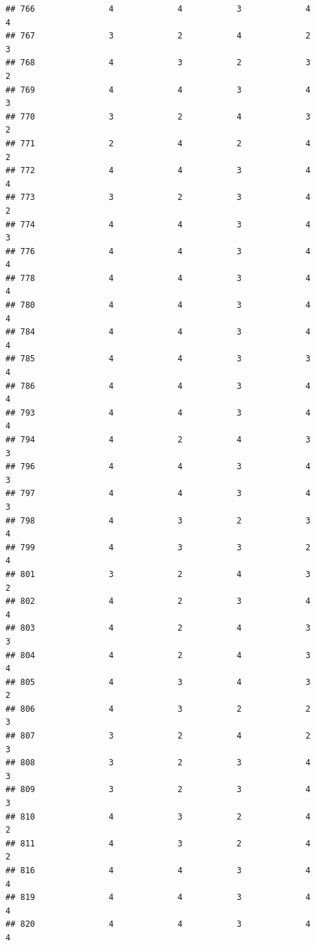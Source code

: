 \documentclass[
]{article}
\begin{document}
\begin{verbatim}
## 766               4             4           3             4            4
## 767               3             2           4             2            3
## 768               4             3           2             3            2
## 769               4             4           3             4            3
## 770               3             2           4             3            2
## 771               2             4           2             4            2
## 772               4             4           3             4            4
## 773               3             2           3             4            2
## 774               4             4           3             4            3
## 776               4             4           3             4            4
## 778               4             4           3             4            4
## 780               4             4           3             4            4
## 784               4             4           3             4            4
## 785               4             4           3             3            4
## 786               4             4           3             4            4
## 793               4             4           3             4            4
## 794               4             2           4             3            3
## 796               4             4           3             4            3
## 797               4             4           3             4            3
## 798               4             3           2             3            4
## 799               4             3           3             2            4
## 801               3             2           4             3            2
## 802               4             2           3             4            4
## 803               4             2           4             3            3
## 804               4             2           4             3            4
## 805               4             3           4             3            2
## 806               4             3           2             2            3
## 807               3             2           4             2            3
## 808               3             2           3             4            3
## 809               3             2           3             4            3
## 810               4             3           2             4            2
## 811               4             3           2             4            2
## 816               4             4           3             4            4
## 819               4             4           3             4            4
## 820               4             4           3             4            4

\end{verbatim}
\end{document}
